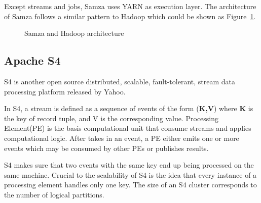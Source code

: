 Except streams and jobs, Samza uses  YARN as execution layer. The architecture of Samza follows a similar pattern to Hadoop which could be shown as Figure~\ref{fig:smaza_architecture}.

\begin{figure}
  \begin{center}
   \caption{Samza and Hadoop architecture}
   \label{fig:smaza_architecture}
  \end{center}
\end{figure}

\subsection{Apache S4}
S4 is another open source distributed, scalable, fault-tolerant, stream data processing platform released by Yahoo.

In S4, a stream is defined as a sequence of events of the form (\textbf{K,V}) where \textbf{K} is the key of record tuple, and V is the corresponding value. Processing Element(PE) is the basis computational unit that consume streams and applies computational logic. After takes in an event, a PE either emits one or more events which may be consumed by other PEs or publishes results\cite{neumeyer2010s4}.

S4 makes sure that two events with the same key end up being processed on the same machine. Crucial to the scalability of S4 is the idea that every instance of a processing element handles only one key. The size of an S4 cluster corresponds to the number of logical partitions. 
 
\clearpage